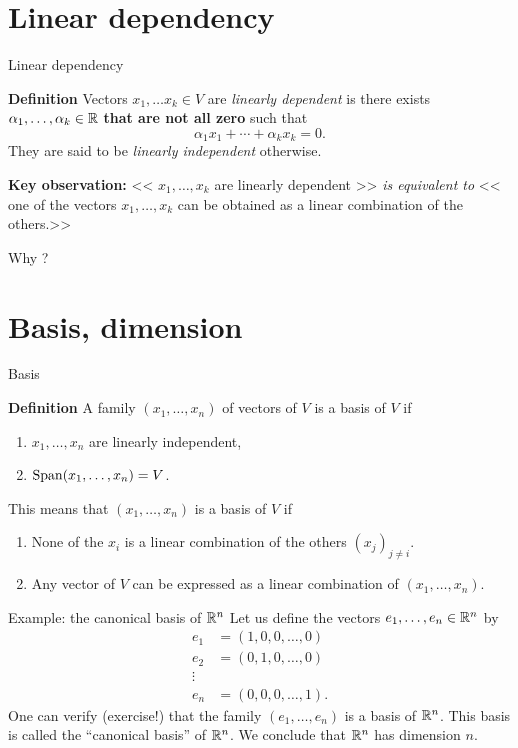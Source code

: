 \documentclass{beamer}
\begin{document}
\section{Linear dependency}

\begin{frame}[t]{Linear dependency}
	\begin{block}{\bf Definition}
		Vectors $x_1, \dots x_k \in V$ are \emph{linearly dependent} is there exists $\alpha_1, \dots, \alpha_k \in \mathbb{R}$ \textbf{that are not all zero} such that 
		$$
		\alpha_1 x_1 + \cdots + \alpha_k x_k = 0.
		$$
		They are said to be \emph{linearly independent} otherwise.
	\end{block}

	\vspace{0.5cm}

	\textbf{Key observation:}
<< $x_1, \dots, x_k$ are linearly dependent >>
\emph{is equivalent to}
<< one of the vectors $x_1, \dots, x_k$ can be obtained as a linear combination of the others.>>
\end{frame}
\begin{frame}[t]{Why ?}
\end{frame}

\section{Basis, dimension}

\begin{frame}[t]{Basis}
	\begin{block}{\bf Definition}
	A family $(x_1, \dots, x_n)$ of vectors of $V$ is a basis of $V$ if
	\begin{enumerate}
		\item $x_1, \dots, x_n$ are linearly independent,
		\item ${{\rm Span}}(x_1, \dots, x_n) = V$.
	\end{enumerate}
	\end{block}
	\vspace{0.5cm}
	This means that $(x_1, \dots, x_n)$ is a basis of $V$ if
	\begin{enumerate}
		\item None of the $x_i$ is a linear combination of the others $(x_j)_{j \neq i}$.
		\item Any vector of $V$ can be expressed as a linear combination of $(x_1, \dots, x_n)$.
	\end{enumerate}
\end{frame}

\begin{frame}[t]{Example: the canonical basis of $\mathbb{R}^n$}
	Let us define the vectors $e_1, \dots, e_n \in \mathbb{R}^n$ by
	\begin{align*}
		e_1 &= (1, 0, 0, \dots, 0) \\
		e_2 &= (0, 1, 0, \dots, 0) \\
		\vdots & \\
		e_n &= (0, 0, 0, \dots, 1).
	\end{align*}
	One can verify (exercise!) that the family $(e_1, \dots, e_n)$ is a basis of $\mathbb{R}^n$. This basis is called the ``canonical basis'' of $\mathbb{R}^n$. We conclude that $\mathbb{R}^n$ has dimension $n$.
\end{frame}
\end{document}
